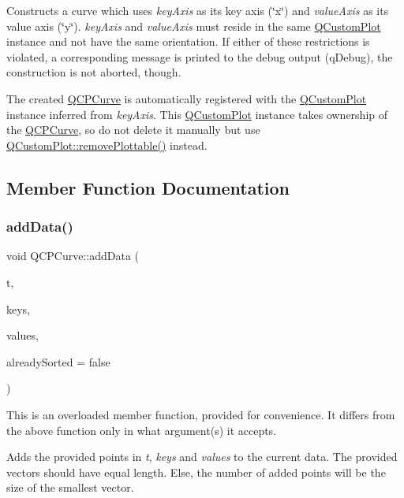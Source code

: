 Constructs a curve which uses {\itshape key\+Axis} as its key axis (\char`\"{}x\char`\"{}) and {\itshape value\+Axis} as its value axis (\char`\"{}y\char`\"{}). {\itshape key\+Axis} and {\itshape value\+Axis} must reside in the same \hyperlink{classQCustomPlot}{Q\+Custom\+Plot} instance and not have the same orientation. If either of these restrictions is violated, a corresponding message is printed to the debug output (q\+Debug), the construction is not aborted, though.

The created \hyperlink{classQCPCurve}{Q\+C\+P\+Curve} is automatically registered with the \hyperlink{classQCustomPlot}{Q\+Custom\+Plot} instance inferred from {\itshape key\+Axis}. This \hyperlink{classQCustomPlot}{Q\+Custom\+Plot} instance takes ownership of the \hyperlink{classQCPCurve}{Q\+C\+P\+Curve}, so do not delete it manually but use \hyperlink{classQCustomPlot_af3dafd56884208474f311d6226513ab2}{Q\+Custom\+Plot\+::remove\+Plottable()} instead. 

\subsection{Member Function Documentation}
\mbox{\label{classQCPCurve_a73edf394b94f3f24f07518e30565a07f}} 
\subsubsection{\texorpdfstring{add\+Data()}{addData()}\hspace{0.1cm}{\footnotesize\ttfamily [1/4]}}
{\footnotesize\ttfamily void Q\+C\+P\+Curve\+::add\+Data (\begin{DoxyParamCaption}\item[{const Q\+Vector$<$ double $>$ \&}]{t,  }\item[{const Q\+Vector$<$ double $>$ \&}]{keys,  }\item[{const Q\+Vector$<$ double $>$ \&}]{values,  }\item[{bool}]{already\+Sorted = {\ttfamily false} }\end{DoxyParamCaption})}

This is an overloaded member function, provided for convenience. It differs from the above function only in what argument(s) it accepts.

Adds the provided points in {\itshape t}, {\itshape keys} and {\itshape values} to the current data. The provided vectors should have equal length. Else, the number of added points will be the size of the smallest vector.

